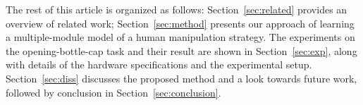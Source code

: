 The rest of this article is organized as follows:
Section~\ref{sec:related} provides an overview of related work;
Section~\ref{sec:method} presents our approach of learning a
multiple-module model of a human manipulation strategy. The
experiments on the opening-bottle-cap task and their result are shown
in Section~\ref{sec:exp}, along with details of the hardware
specifications and the experimental setup. Section~\ref{sec:diss}
discusses the proposed method and a look towards future work, followed by conclusion in Section~\ref{sec:conclusion}.
